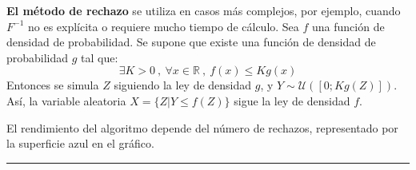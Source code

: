 \begin{f}
\textbf{El método de rechazo} se utiliza en casos más complejos, por ejemplo, cuando \(F^{-1}\) no es explícita o requiere mucho tiempo de cálculo. 
Sea \(f\) una función de densidad de probabilidad. Se supone que existe una función de densidad de probabilidad \(g\) tal que:
\[
{\displaystyle \exists K>0\ ,\ \forall x\in \mathbb {R} \ ,\ f(x)\leq Kg(x)}
\]
Entonces se simula \(Z\) siguiendo la ley de densidad \(g\), y \({\displaystyle Y\sim {\mathcal {U}}([0;Kg(Z)])} \).
Así, la variable aleatoria \({\displaystyle X=\lbrace Z|Y\leq f(Z)\rbrace } \) sigue la ley de densidad \(f\).




El rendimiento del algoritmo depende del número de rechazos, representado por la superficie azul en el gráfico.
\end{f}
\hrule

%


